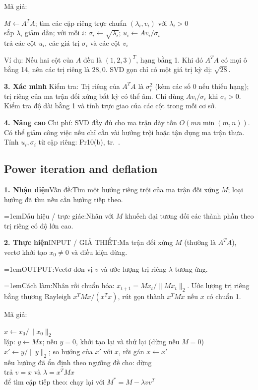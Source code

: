 \documentclass[10pt,a4paper,twocolumn]{article}
\makeatletter
\newif\ifexamheadingprinted
\newcommand{\topic}[2]{%
  \global\examheadingprintedfalse\par\subsection{#2}\label{topic:#1}}
\newcommand{\key}[1]{#1:\enspace}
\newcommand{\algfield}[2]{\par\noindent\hangindent=1em\relax#1:\enspace#2}
\newcommand{\unitheading}[2]{%
  \par\addvspace{1pt}\noindent\textbf{#1. #2}\enspace}
\newcommand{\unitverification}{\unitheading{3}{Xác minh}}
\newcommand{\unitadvanced}{\unitheading{4}{Nâng cao}}
\newcommand{\unitfield}[4]{%
  \par\noindent\textbf{#1. #2}\enspace #3:\enspace #4}
\newcommand{\algsummary}[6]{%
  \begingroup\setlength{\parskip}{1pt}%
  \unitfield{1}{Nhận diện}{Vấn đề}{#1}%
  \algfield{Dấu hiệu / trực giác}{#2}%
  \if\relax\detokenize{#3}\relax\else\par\noindent#3\par\fi%
  \unitfield{2}{Thực hiện}{INPUT / GIẢ THIẾT}{#4}%
  \algfield{OUTPUT}{#5}%
  \algfield{Cách làm}{#6}\par\endgroup}
\newenvironment{algpseudo}{%
  \par\addvspace{2pt}\noindent
  \setlength{\parskip}{0pt}%
  Mã giả:\par\nobreak
  \begin{list}{}{\setlength{\leftmargin}{1em}\setlength{\topsep}{0pt}%
    \setlength{\partopsep}{0pt}\setlength{\parsep}{0pt}%
    \@beginparpenalty=10000\relax}%
  \item\relax
}{\end{list}\par\addvspace{3pt}}
\makeatother
\begin{document}
\begin{algpseudo}
$M\gets A^TA$; tìm các cặp riêng trực chuẩn $(\lambda_i,v_i)$ với $\lambda_i>0$\\
sắp $\lambda_i$ giảm dần; với mỗi $i$: $\sigma_i\gets\sqrt{\lambda_i}$; $u_i\gets Av_i/\sigma_i$\\
trả các cột $u_i$, các giá trị $\sigma_i$ và các cột $v_i$
\end{algpseudo}

\key{Ví dụ} Nếu hai cột của $A$ đều là $(1,2,3)^T$, hạng bằng 1. Khi đó $A^TA$ có mọi ô bằng 14, nên các trị riêng là $28,0$. SVD gọn chỉ có một giá trị kỳ dị: $\sqrt{28}$.

\unitverification
\key{Kiểm tra} Trị riêng của $A^TA$ là $\sigma_i^2$ (kèm các số 0 nếu thiếu hạng); trị riêng của ma trận đối xứng bất kỳ có thể âm. Chỉ dùng $Av_i/\sigma_i$ khi $\sigma_i>0$. Kiểm tra độ dài bằng 1 và tính trực giao của các cột trong mỗi cơ sở.

\unitadvanced
\key{Chi phí} SVD đầy đủ cho ma trận dày tốn $O(mn\min(m,n))$. Có thể giảm công việc nếu chỉ cần vài hướng trội hoặc tận dụng ma trận thưa. Tính $u_i,\sigma_i$ từ cặp riêng: Pr10(b), tr.~\pageref*{question:Pr10}.

\topic{powerdeflation}{Power iteration and deflation}

\algsummary{Tìm một hướng riêng trội của ma trận đối xứng $M$; loại hướng đã tìm nếu cần hướng tiếp theo.}{Nhân với $M$ khuếch đại tương đối các thành phần theo trị riêng có độ lớn cao.}{}{Ma trận đối xứng $M$ (thường là $A^TA$), vectơ khởi tạo $x_0\ne0$ và điều kiện dừng.}{Vectơ đơn vị $v$ và ước lượng trị riêng $\lambda$ tương ứng.}{Nhân rồi chuẩn hóa: $x_{t+1}=Mx_t/\|Mx_t\|_2$. Ước lượng trị riêng bằng thương Rayleigh $x^TMx/(x^Tx)$, rút gọn thành $x^TMx$ nếu $x$ có chuẩn 1.}

\begin{algpseudo}
$x\gets x_0/\|x_0\|_2$\\
lặp: $y\gets Mx$; nếu $y=0$, khởi tạo lại và thử lại (dừng nếu $M=0$)\\
\quad $x'\gets y/\|y\|_2$; so hướng của $x'$ với $x$, rồi gán $x\gets x'$\\
\quad nếu hướng đã ổn định theo ngưỡng đề cho: dừng\\
trả $v=x$ và $\lambda=x^TMx$\\
để tìm cặp tiếp theo: chạy lại với $M^*=M-\lambda vv^T$
\end{algpseudo}
\end{document}
